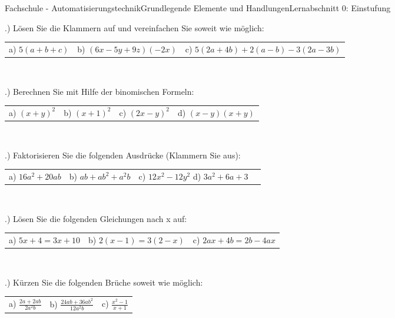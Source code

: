 \documentclass[oneside,openany,headings=optiontotoc,11pt,numbers=noenddot]{scrreprt}
\begin{document}
	\begin{worksheet}{Fachschule - Automatisierungstechnik}{Grundlegende Elemente und Handlungen}{Lernabschnitt 0: Einstufung}
				
		\noindent
		\begin{framed}
			.) Lösen Sie die Klammern auf und vereinfachen Sie soweit wie möglich:\\
			\par\noindent
			\begin{tabularx}{\textwidth}{lll}
				a) \(5(a + b + c)\) & b) \((6x -5y +9z)(-2x)\) & c) \(5(2a+4b)+2(a-b)-3(2a-3b)\)
			\end{tabularx}\\
			\par{}.) Berechnen Sie mit Hilfe der binomischen Formeln:\\
			\par\noindent
			\begin{tabularx}{\textwidth}{llll}
				a) \((x+y)^2\) & b) \((x+1)^2\) & c) \((2x-y)^2\) & d) \((x-y)(x+y)\)
			\end{tabularx}\\
			\par{}.) Faktorisieren Sie die folgenden Ausdrücke (Klammern Sie aus):\\
			\par\noindent
			\begin{tabularx}{\textwidth}{llll}
				a) \(16a^2+20ab\) & b) \(ab+ab^2+a^2b\) & c) \(12x^2-12y^2\) d) \(3a^2+6a+3\)
			\end{tabularx}\\
			\par{}.) Lösen Sie die folgenden Gleichungen nach x auf:\\
			\par\noindent
			\begin{tabularx}{\textwidth}{lll}
				a) \(5x+4 = 3x+10\) & b) \(2(x-1) = 3(2-x)\) & c) \(2ax+4b = 2b -4ax\)
			\end{tabularx}\\
			\par{}.) Kürzen Sie die folgenden Brüche soweit wie möglich:\\
			\par\noindent
			\begin{tabularx}{\textwidth}{lll}
				a) \(\frac{2a+2ab}{2a^2b}\) & b) \(\frac{24ab+36ab^2}{12a^2b}\) & c) \(\frac{x^2-1}{x+1}\)
			\end{tabularx}\\

\end{framed}
\end{worksheet}
\end{document}
